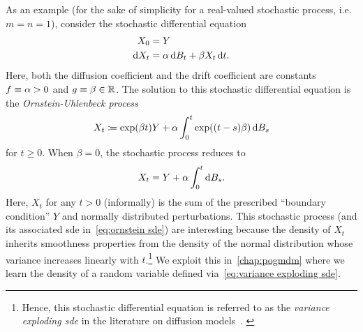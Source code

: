 As an example (for the sake of simplicity for a real-valued stochastic process, i.e. \( m = n = \num{1} \)), consider the stochastic differential equation
\begin{equation}
	\begin{aligned}
		X_{\num{0}} &= Y\\
		\mathrm{d}X_t &= \alpha\,\mathrm{d}B_t + \beta X_t\,\mathrm{d}t.
	\end{aligned}
	\label{eq:ornstein sde}
\end{equation}
Here, both the diffusion coefficient and the drift coefficient are constants \( f \equiv \alpha > \num{0} \) and \( g \equiv \beta \in \mathbb{R} \).
The solution to this stochastic differential equation is the \emph{Ornstein-Uhlenbeck process}
\begin{equation}
	X_t \coloneqq \exp(\beta t)Y + \alpha \int_{\num{0}}^t\exp((t-s)\beta)\,\mathrm{d}B_s
\end{equation}
for \( t \geq \num{0} \).
When \( \beta = \num{0} \), the stochastic process reduces to
\begin{equation}
	X_t = Y + \alpha \int_{\num{0}}^t \mathrm{d}B_s.
\label{eq:variance exploding sde}
\end{equation}
Here, \( X_t \) for any \( t > \num{0} \) (informally) is the sum of the prescribed \enquote{boundary condition} \( Y \) and normally distributed perturbations.
This stochastic process (and its associated \gls{sde} in~\cref{eq:ornstein sde}) are interesting because the density of \( X_t \) inherits smoothness properties from the density of the normal distribution whose variance increases linearly with \( t \).\footnote{%
	Hence, this stochastic differential equation is referred to as the \emph{variance exploding \gls{sde}} in the literature on diffusion models~\cite[section 3.4]{song_scorebased_2021}.%
	\label{def:variance exploding}
}
We exploit this in~\cref{chap:pogmdm} where we learn the density of a random variable defined via~\cref{eq:variance exploding sde}.

